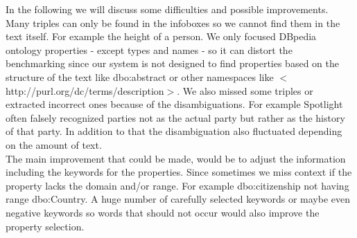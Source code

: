 \documentclass[runningheads]{llncs}
\begin{document}
In the following we will discuss some difficulties and possible improvements. Many triples can only be found in the infoboxes so we cannot find them in the text itself. For example the height of a person. We only focused DBpedia ontology properties - except types and names - so it can distort the benchmarking since our system is not designed to find properties based on the structure of the text like dbo:abstract or other namespaces like $<$http://purl.org/dc/terms/description$>$. We also missed some triples or extracted incorrect ones because of the disambiguations. For example Spotlight often falsely recognized parties not as the actual party but rather as the history of that party. In addition to that the disambiguation also fluctuated depending on the amount of text.\\

The main improvement that could be made, would be to adjust the information including the keywords for the properties. Since sometimes we miss context if the property lacks the domain and/or range. For example dbo:citizenship not having range dbo:Country. A huge number of carefully selected keywords or maybe even negative keywords so words that should not occur would also improve the property selection. 

 
%
%



%
\end{document}
